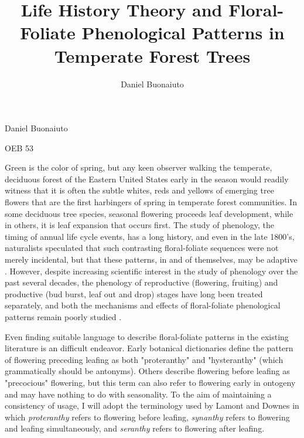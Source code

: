 \documentclass{article}\usepackage[]{graphicx}\usepackage[]{color}
\begin{document}
\title{Life History Theory and Floral-Foliate Phenological Patterns in Temperate Forest Trees}
\author{Daniel Buonaiuto}
Daniel Buonaiuto
\par OEB 53
\par\data{\today}

Green is the color of spring, but any keen observer walking the temperate, deciduous forest of the Eastern United States early in the season would readily witness that it is often the subtle whites, reds and yellows of emerging tree flowers that are the first harbingers of spring in temperate forest communities. In some deciduous tree species, seasonal flowering proceeds leaf development, while in others, it is leaf expansion that occurs first. The study of phenology, the timing of annual life cycle events, has a long history, and even in the late 1800's, naturalists speculated that such contrasting floral-foliate sequences were not merely incidental, but that these patterns, in and of themselves, may be adaptive \citep{Robertson1885}. However, despite increasing scientific interest in the study of phenology over the past several decades, the phenology of reproductive (flowering, fruiting) and productive (bud burst, leaf out and drop) stages have long been treated separately, and both the mechanisms and effects of floral-foliate phenological patterns remain poorly studied \citep{Wolkovich2014}.
\par Even finding suitable language to describe floral-foliate patterns in the existing literature is an difficult endeavor. Early botanical dictionaries define the pattern of flowering preceding leafing as both "proteranthy" and "hysteranthy" (which grammatically should be antonyms). Others describe flowering before leafing as "precocious" flowering, but this term can also refer to flowering early in ontogeny and may have nothing to do with seasonality. To the aim of maintaining a consistency of usage, I will adopt the terminology used by Lamont and Downes \citeyear{Lamont2011} in which \textit{proteranthy} refers to flowering before leafing, \textit{synanthy} refers to flowering and leafing simultaneously, and \textit{seranthy} refers to flowering after leafing.
\end{document}
